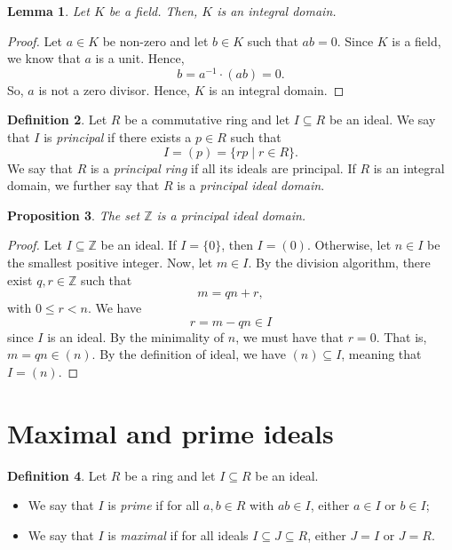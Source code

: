 \documentclass[a4paper, openany]{memoir}
\theoremstyle{definition}
\newtheorem{definition}{Definition}[section]
\theoremstyle{plain}
\newtheorem{lemma}[definition]{Lemma}
\newtheorem{proposition}[definition]{Proposition}
\begin{document}
    \begin{lemma}
        Let $K$ be a field. Then, $K$ is an integral domain.
    \end{lemma}
    \begin{proof}
        Let $a \in K$ be non-zero and let $b \in K$ such that $ab = 0$. Since $K$ is a field, we know that $a$ is a unit. Hence,
        \[b = a^{-1} \cdot (ab) = 0.\]
        So, $a$ is not a zero divisor. Hence, $K$ is an integral domain.
    \end{proof}

    \begin{definition}
        Let $R$ be a commutative ring and let $I \subseteq R$ be an ideal. We say that $I$ is \emph{principal} if there exists a $p \in R$ such that
        \[I = (p) = \{rp \mid r \in R\}.\]
        We say that $R$ is a \emph{principal ring} if all its ideals are principal. If $R$ is an integral domain, we further say that $R$ is a \emph{principal ideal domain}.
    \end{definition}

    \begin{proposition}
        The set $\mathbb{Z}$ is a principal ideal domain.
    \end{proposition}
    \begin{proof}
        Let $I \subseteq \mathbb{Z}$ be an ideal. If $I = \{0\}$, then $I = (0)$. Otherwise, let $n \in I$ be the smallest positive integer. Now, let $m \in I$. By the division algorithm, there exist $q, r \in \mathbb{Z}$ such that
        \[m = qn + r,\]
        with $0 \leq r < n$. We have
        \[r = m - qn \in I\]
        since $I$ is an ideal. By the minimality of $n$, we must have that $r = 0$. That is, $m = qn \in (n)$. By the definition of ideal, we have $(n) \subseteq I$, meaning that $I = (n)$.
    \end{proof}
    \newpage

    \section{Maximal and prime ideals}
    \begin{definition}
        Let $R$ be a ring and let $I \subseteq R$ be an ideal.
        \begin{itemize}
            \item We say that $I$ is \emph{prime} if for all $a, b \in R$ with $ab \in I$, either $a \in I$ or $b \in I$;
            \item We say that $I$ is \emph{maximal} if for all ideals $I \subseteq J \subseteq R$, either $J = I$ or $J = R$.
        \end{itemize}
    \end{definition}
\end{document}
